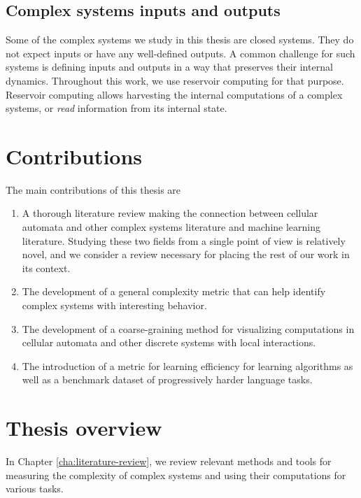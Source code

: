 \subsection{Complex systems inputs and outputs}

Some of the complex systems we study in this thesis are closed systems. They do
not expect inputs or have any well-defined outputs. A common challenge for such
systems is defining inputs and outputs in a way that preserves their internal
dynamics. Throughout this work, we use reservoir computing for that purpose.
Reservoir computing allows harvesting the internal computations of a complex
systems, or \emph{read} information from its internal state.


\section{Contributions}

The main contributions of this thesis are
\begin{enumerate}
  \item A thorough literature review making the connection between cellular
        automata and other complex systems literature and machine learning
        literature. Studying these two fields from a single point of view is
        relatively novel, and we consider a review necessary for placing the
        rest of our work in its context.

  \item The development of a general complexity metric that can help identify
        complex systems with interesting behavior.

  \item The development of a coarse-graining method for visualizing computations
        in cellular automata and other discrete systems with local interactions.

  \item The introduction of a metric for learning efficiency for learning
        algorithms as well as a benchmark dataset of progressively harder
        language tasks.
\end{enumerate}

\section{Thesis overview}

In Chapter \ref{cha:literature-review}, we review relevant methods and tools for
measuring the complexity of complex systems and using their computations for
various tasks.

